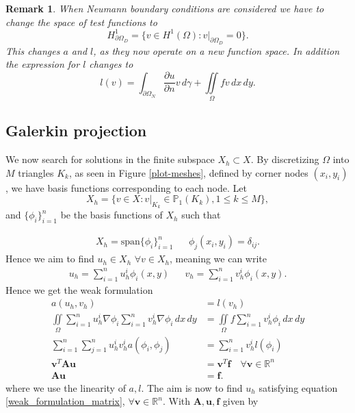 \documentclass[5pt,a4paper,english]{elsarticle}%
\newcommand{\restr}[2]{\ensuremath{\left.#1\right|_{#2}}}
\newtheorem*{remark}{Remark}
\begin{document}
\begin{remark}
    When Neumann boundary conditions are considered we have to change the space of test functions to 
    \begin{equation}
        H^1_{\partial \Omega_D } = \{v \in H^1(\Omega):\restr{v}{\partial \Omega_D }=0 \}.
    \end{equation}
    This changes $a$ and $l$, as they now operate on a new function space. In addition the expression for $l$ changes to
    \begin{equation}
        l(v) = \int_{\partial \Omega_N} \frac{\partial u}{\partial n} v \, d\gamma + \iint\limits_{\Omega} f v  \, dx \, dy.
        \label{neumann-conditions}
    \end{equation}
\end{remark}

\subsection{Galerkin projection}

We now search for solutions in the finite subspace $X_h \subset X$. 
By discretizing $\Omega$ into $M$ triangles $K_k$, as seen in Figure \ref{plot-meshes}, defined by corner nodes $(x_i,y_i)$, we have basis functions corresponding to each node.
Let 
\begin{equation*}
X_h = \{ v \in X : v|_{K_k} \in \mathbb{P}_1 (K_k),1\leq k\leq M \},
\end{equation*}
and $\{\phi_i\}_{i=1}^n$ be the basis functions of $X_h$ such that

\begin{equation*}
    \begin{aligned}
X_h = \text{span} \{\phi_i\}_{i=1}^n & & \phi_j(x_i,y_i) = \delta_{ij}.
    \end{aligned}
\end{equation*}
Hence we aim to find $u_h \in X_h$ $\forall v \in X_h$, meaning we can write
\begin{equation*}
    \begin{aligned}
u_h = \sum_{i=1}^n u_h^i \phi_i(x,y) & & v_h = \sum_{i=1}^n v_h^i \phi_i(x,y).
    \end{aligned}
\end{equation*}
Hence we get the weak formulation
\begin{equation}
\begin{aligned}
a(u_h,v_h) &= l(v_h) 
\\
\iint\limits_{\Omega} 
\sum_{i=1}^n u_h^i \nabla \phi_i \sum_{i=1}^n v_h^i \nabla\phi_i \, dx \, dy 
&= \iint\limits_{\Omega} f \sum_{i=1}^n v_h^i \phi_i \, dx \, dy
\\
\sum_{i=1}^n\sum_{j=1}^n u_h^i v_h^i a(\phi_i,\phi_j) &= \sum_{i=1}^n v_h^i l(\phi_i)
\\
\bm v^T\bm A \bm u &= \bm v^T \bm f \quad \forall \bm v \in \mathbb R^n
\\ \bm A \bm u &= \bm f.
\label{weak_formulation_matrix}
\end{aligned}
\end{equation}
where we use the linearity of $a,l$. 
The aim is now to find $u_h$ satisfying equation \eqref{weak_formulation_matrix}, $\forall \bm v \in \mathbb R^n$.
With $\bm A, \bm u, \bm f$ given by
\end{document}
